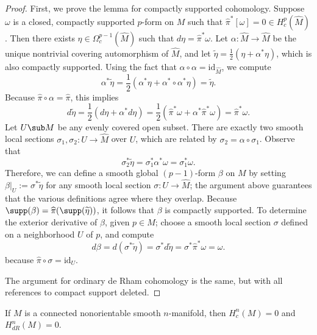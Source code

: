 \begin{proof}
First, we prove the lemma for compactly supported cohomology. Suppose $\omega$ is a closed, compactly supported $p$-form on $M$ such that $\widehat{\pi}^*[\omega]=0\in H^p_c(\widehat{M})$. Then there exists $\eta\in\Omega^{p-1}_c(\widehat{M})$ such that $d\eta=\widehat{\pi}^*\omega$. Let $\alpha:\widehat{M}\to\widehat{M}$ be the unique nontrivial covering automorphism of $\widehat{M}$, and let $\widetilde{\eta}=\frac{1}{2}(\eta+\alpha^*\eta)$, which is also compactly supported. Using the fact that $\alpha\circ\alpha=\mathrm{id}_{\widehat{M}}$, we compute
\[\alpha^*\widetilde{\eta}=\frac{1}{2}(\alpha^*\eta+\alpha^*\circ\alpha^*\eta)=\widetilde{\eta}.\]
Because $\widehat{\pi}\circ\alpha=\widehat{\pi}$, this implies
\[d\widetilde{\eta}=\frac{1}{2}(d\eta+\alpha^*d\eta)=\frac{1}{2}(\widehat{\pi}^*\omega+\alpha^*\widehat{\pi}^*\omega)=\widehat{\pi}^*\omega.\]
Let $U\sub M$ be any evenly covered open subset. There are exactly two smooth local sections $\sigma_1,\sigma_2:U\to \widehat{M}$ over $U$, which are related by $\sigma_2=\alpha\circ\sigma_1$. Observe that
\[\sigma_2^*\widetilde{\eta}=\sigma_1^*\alpha^*\omega=\sigma_1^*\omega.\]
Therefore, we can define a smooth global $(p-1)$-form $\beta$ on $M$ by setting $\beta|_U:=\sigma^*\widetilde{\eta}$ for any smooth local section $\sigma:U\to\widehat{M}$; the argument above guarantees that the various definitions agree where they overlap. Because $\supp(\beta)=\widehat{\pi}(\supp(\widetilde{\eta}))$, it follows that $\beta$ is compactly supported. To determine the exterior derivative of $\beta$, given $p\in M$; choose a smooth local section $\sigma$ defined on a neighborhood $U$ of $p$, and compute
\[d\beta=d(\sigma^*\widetilde{\eta})=\sigma^*d\widetilde{\eta}=\sigma^*\widehat{\pi}^*\omega=\omega.\]
because $\widehat{\pi}\circ\sigma=\mathrm{id}_U$.\par
The argument for ordinary de Rham cohomology is the same, but with all references
to compact support deleted.
\end{proof}
\begin{theorem}\label{cohomology n nonorientable}
If $M$ is a connected nonorientable smooth $n$-manifold, then $H^n_c(M)=0$ and $H^n_{dR}(M)=0$.
\end{theorem}
